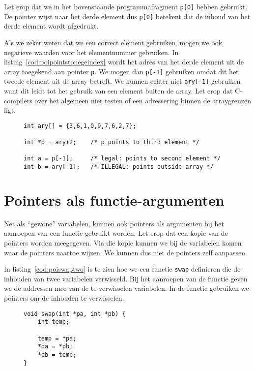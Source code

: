 Let erop dat we in het bovenstaande programmafragment \texttt{p[0]} hebben gebruikt. De pointer wijst naar het derde element dus \texttt{p[0]} betekent dat de inhoud van het derde element wordt afgedrukt.

Als we zeker weten dat we een correct element gebruiken, mogen we ook negatieve waarden voor het elementnummer gebruiken. In listing~\ref{cod:poipointstonegeindex} wordt het adres van het derde element uit de array toegekend aan pointer \texttt{p}. We mogen dan \texttt{p[-1]} gebruiken omdat dit het tweede element uit de array betreft. We kunnen echter niet \texttt{ary[-1]} gebruiken want dit leidt tot het gebruik van een element buiten de array. Let erop dat C-compilers over het algemeen niet testen of een adressering binnen de arraygrenzen ligt.

\begin{figure}[!ht]
\begin{lstlisting}[caption=Pointer die naar een element in een array wijst.,label=cod:poipointstonegeindex]
int ary[] = {3,6,1,0,9,7,6,2,7};

int *p = ary+2;    /* p points to third element */

int a = p[-1];     /* legal: points to second element */
int b = ary[-1];   /* ILLEGAL: points outside array */
\end{lstlisting}
\end{figure}

\section{Pointers als functie-argumenten}
\label{sec:pointersalsfunctieargumenten}
Net als ``gewone'' variabelen, kunnen ook pointers als argumenten bij het aanroepen van een functie gebruikt worden. Let erop dat een kopie van de pointers worden meegegeven. Via die kopie kunnen we bij de variabelen komen waar de pointers naartoe wijzen. We kunnen dus niet de pointers zelf aanpassen.

In listing~\ref{cod:poiswaptwo} is te zien hoe we een functie \texttt{swap} definieren die de inhouden van twee variabelen verwisseld. Bij het aanroepen van de functie geven we de addressen mee van de te verwisselen variabelen. In de functie gebruiken we pointers om de inhouden te verwisselen.

\begin{figure}[!ht]
\begin{lstlisting}[caption=Het verwisselen van twee variabelen met behulp van pointers.,label=cod:poiswaptwo]
void swap(int *pa, int *pb) {
	int temp;

    temp = *pa;
    *pa = *pb;
    *pb = temp;
}
\end{lstlisting}
\end{figure}

